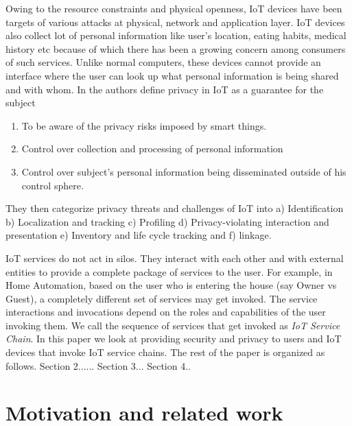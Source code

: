 \documentclass[journal]{IEEEtran}
\begin{document}
Owing to the resource constraints and physical openness, IoT devices have been targets of various attacks \cite{iot-sec} at physical, network and application layer. IoT devices also collect lot of personal information like user's location, eating habits, medical history etc because of which there has been a growing concern among consumers of such services. Unlike normal computers, these devices cannot provide an interface where the user can look up what personal information is being shared and with whom. In \cite{Ziegeldorf2014PrivacyIT} the authors define privacy in IoT as a guarantee for the subject	

\begin{enumerate}[label=\alph*)]
	\item To be aware of the privacy risks imposed by smart things.
	\item Control over collection and processing of personal information
	\item Control over subject's personal information being disseminated outside of his control sphere.
\end{enumerate}
They then categorize privacy threats and challenges of IoT into a) Identification b) Localization and tracking c) Profiling d) Privacy-violating interaction and presentation e) Inventory and life cycle tracking and f) linkage.

IoT services do not act in silos. They interact with each other and with external entities to provide a complete package of services to the user. For example, in Home Automation, based on the user who is entering the house (say Owner vs Guest), a completely different set of services may get invoked. The service interactions and invocations depend on the roles and capabilities of the user invoking them. We call the sequence of services that get invoked as \textit{IoT Service Chain}. In this paper we look at providing security and privacy to users and IoT devices that invoke IoT service chains. The rest of the paper is organized as follows. Section 2...... Section 3... Section 4..

\section{Motivation and related work}
\end{document}
